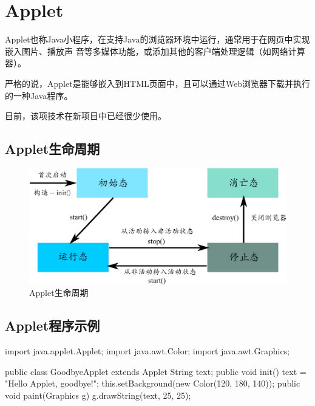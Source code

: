 
  

\section{Applet}

Applet也称Java小程序，在支持Java的浏览器环境中运行，通常用于在网页中实现嵌入图片、播放声
音等多媒体功能，或添加其他的客户端处理逻辑（如网络计算器）。

{\hei 严格的说，Applet是能够嵌入到HTML页面中，且可以通过Web浏览器下载并执行的一种Java程序。}

目前，该项技术在新项目中已经很少使用。

\subsection{Applet生命周期}

\begin{figure}[htb]
\centering
\includegraphics[width=.8\textwidth]{images/Java-GUI-programming/fig-applet-lifecycle.pdf}
\caption{Applet生命周期}
\label{fig:fig-applet-lifecycle}
\end{figure}

\subsection{Applet程序示例}


\begin{javaCode}
  import java.applet.Applet;
  import java.awt.Color;
  import java.awt.Graphics;

  public class GoodbyeApplet extends Applet {
    String text;
    public void init() {
      text = "Hello Applet, goodbye!";
      this.setBackground(new Color(120, 180, 140));
    }
    public void paint(Graphics g) {
      g.drawString(text, 25, 25);
    }
  }
\end{javaCode}

